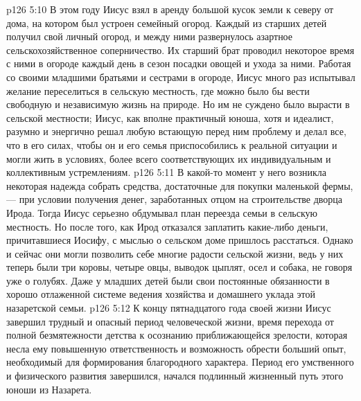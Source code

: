\vs p126 5:10 \pc В этом году Иисус взял в аренду большой кусок земли к северу от дома, на котором был устроен семейный огород. Каждый из старших детей получил свой личный огород, и между ними развернулось азартное сельскохозяйственное соперничество. Их старший брат проводил некоторое время с ними в огороде каждый день в сезон посадки овощей и ухода за ними. Работая со своими младшими братьями и сестрами в огороде, Иисус много раз испытывал желание переселиться в сельскую местность, где можно было бы вести свободную и независимую жизнь на природе. Но им не суждено было вырасти в сельской местности; Иисус, как вполне практичный юноша, хотя и идеалист, разумно и энергично решал любую встающую перед ним проблему и делал все, что в его силах, чтобы он и его семья приспособились к реальной ситуации и могли жить в условиях, более всего соответствующих их индивидуальным и коллективным устремлениям.
\vs p126 5:11 В какой\hyp{}то момент у него возникла некоторая надежда собрать средства, достаточные для покупки маленькой фермы, --- при условии получения денег, заработанных отцом на строительстве дворца Ирода. Тогда Иисус серьезно обдумывал план переезда семьи в сельскую местность. Но после того, как Ирод отказался заплатить какие\hyp{}либо деньги, причитавшиеся Иосифу, с мыслью о сельском доме пришлось расстаться. Однако и сейчас они могли позволить себе многие радости сельской жизни, ведь у них теперь были три коровы, четыре овцы, выводок цыплят, осел и собака, не говоря уже о голубях. Даже у младших детей были свои постоянные обязанности в хорошо отлаженной системе ведения хозяйства и домашнего уклада этой назаретской семьи.
\vs p126 5:12 \pc К концу пятнадцатого года своей жизни Иисус завершил трудный и опасный период человеческой жизни, время перехода от полной безмятежности детства к осознанию приближающейся зрелости, которая несла ему повышенную ответственность и возможность обрести больший опыт, необходимый для формирования благородного характера. Период его умственного и физического развития завершился, начался подлинный жизненный путь этого юноши из Назарета.
